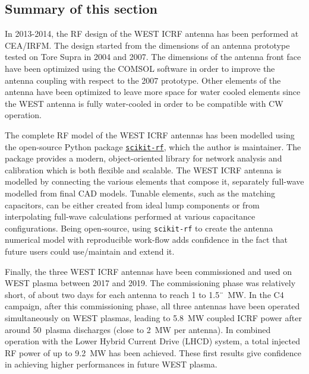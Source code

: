 {%

\subsection{Summary of this section}
In 2013-2014, the RF design of the WEST ICRF antenna has been performed at CEA/IRFM. The design started from the dimensions of an antenna prototype tested on Tore Supra in 2004 and 2007. The dimensions of the antenna front face have been optimized using the COMSOL software in order to improve the antenna coupling with respect to the 2007 prototype. Other elements of the antenna have been optimized to leave more space for water cooled elements since the WEST antenna is fully water-cooled in order to be compatible with CW operation. 

The complete RF model of the WEST ICRF antennas has been modelled using the open-source Python package \href{http://scikit-rf.org/}{\texttt{scikit-rf}}, which the author is maintainer. The package provides a modern, object-oriented library for network analysis and calibration which is both flexible and scalable. The WEST ICRF antenna is modelled by connecting the various elements that compose it, separately full-wave modelled from final CAD models. Tunable elements, such as the matching capacitors, can be either created from ideal lump components or from interpolating full-wave calculations performed at various capacitance configurations. Being open-source, using \texttt{scikit-rf} to create the antenna numerical model with reproducible work-flow adds confidence in the fact that future users could use/maintain and extend it.

Finally, the three WEST ICRF antennas have been commissioned and used on WEST plasma between 2017 and 2019. The commissioning phase was relatively short, of about two days for each antenna to reach 1 to 1.5¨~MW. In the C4 campaign, after this commissioning phase, all three antennas have been operated simultaneously on WEST plasmas, leading to 5.8~MW coupled ICRF power after around 50~plasma discharges (close to 2~MW per antenna). %
In combined operation with the Lower Hybrid Current Drive (LHCD) system, a total injected RF power of up to 9.2~MW has been achieved. These first results give confidence in achieving higher performances in future WEST plasma.


}
